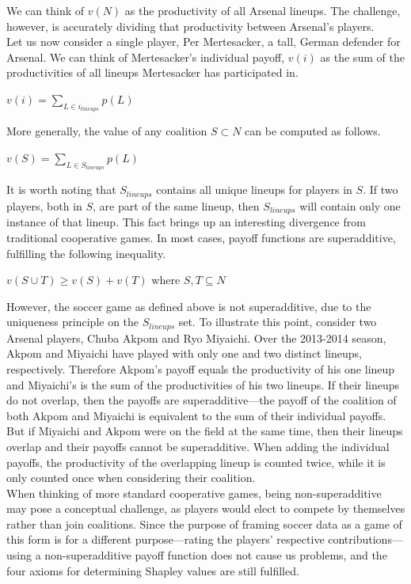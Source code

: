 \documentclass[a4paper,10pt]{article}
\newcommand{\br}{\\[10pt]}
\begin{document}
  We can think of $v(N)$ as the productivity of all Arsenal lineups. The challenge, however, is accurately dividing that productivity between Arsenal's players.
  \br
  Let us now consider a single player, Per Mertesacker, a tall, German defender for Arsenal. We can think of Mertesacker's individual payoff, $v({i})$ as the sum of the productivities of all lineups Mertesacker has participated in.
  \begin{center}
    $v({i}) = \sum\limits_{L \in {i}_{lineups}} p(L)$
  \end{center}
  More generally, the value of any coalition $S \subset N$ can be computed as follows.
  \begin{center}
    $v(S) = \sum\limits_{L \in S_{lineups}} p(L)$
  \end{center}
  It is worth noting that $S_{lineups}$ contains all unique lineups for players in $S$. If two players, both in $S$, are part of the same lineup, then $S_{lineups}$ will contain only one instance of that lineup. This fact brings up an interesting divergence from traditional cooperative games. In most cases, payoff functions are superadditive, fulfilling the following inequality.
  \begin{center}
    $v(S \cup T) \geq v(S) + v(T)$ where $S,T \subseteq N$ 
  \end{center}
  However, the soccer game as defined above is not superadditive, due to the uniqueness principle on the $S_{lineups}$ set. To illustrate this point, consider two Arsenal players, Chuba Akpom and Ryo Miyaichi. Over the 2013-2014 season, Akpom and Miyaichi have played with only one and two distinct lineups, respectively. Therefore Akpom's payoff equals the productivity of his one lineup and Miyaichi's is the sum of the productivities of his two lineups. If their lineups do not overlap, then the payoffs are superadditive---the payoff of the coalition of both Akpom and Miyaichi is equivalent to the sum of their individual payoffs. But if Miyaichi and Akpom were on the field at the same time, then their lineups overlap and their payoffs cannot be superadditive. When adding the individual payoffs, the productivity of the overlapping lineup is counted twice, while it is only counted once when considering their coalition.
  \br
  When thinking of more standard cooperative games, being non-superadditive may pose a conceptual challenge, as players would elect to compete by themselves rather than join coalitions. Since the purpose of framing soccer data as a game of this form is for a different purpose---rating the players' respective contributions---using a non-superadditive payoff function does not cause us problems, and the four axioms for determining Shapley values are still fulfilled. 
  
\end{document}
